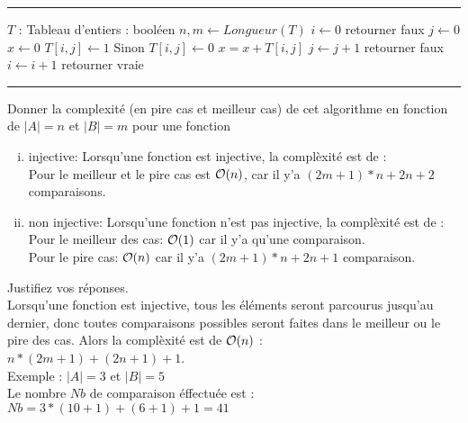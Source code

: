 \begin{enumerate}[1)]
\begin{framed}
\rule{0.8\textwidth}{0.4mm}
            \begin{algorithmic}[1]
                 {$T$ : Tableau d'entiers} : bool\'een
                    \State $n,m \gets Longueur(T)$
                    \State $i \gets 0 $
                     retourner faux
                    \EndIf
                       \State $j \gets 0$
                        \State $x \gets 0 $
                            $T[i,j] \gets 1$ 
                            \State Sinon $T[i,j] \gets 0$
                           \EndIf
                           \State $x = x + T[i,j]$
                           \State $j \gets j+1$
                        \EndWhile
                         retourner faux
                        \EndIf
                        \State $i \gets i+1$
                    \EndWhile
                    \State retourner vraie
                \EndFunction
            \end{algorithmic}
\rule{0.8\textwidth}{0.4mm}

\vspace{.5cm}
Donner la complexit\'e (en pire cas et meilleur cas) de cet algorithme en fonction de $|A|=n$ et $|B|=m$ pour une fonction
\begin{enumerate}[(i)]
\item injective:
Lorsqu'une fonction est injective, la complèxité est de :\\
Pour le meilleur et le pire cas est  ${\cal O}(n)$, car il y'a
$(2m+1)*n+2n+2$ comparaisons.\\
\item non injective: 
Lorsqu'une fonction n'est pas injective, la complèxité est de :\\
Pour le meilleur des cas:  ${\cal O}(1)$ car il y'a qu'une comparaison.\\
Pour le pire cas: ${\cal O}(n)$ car il y'a $(2m+1)*n+2n+1$ comparaison.\\

\end{enumerate}
Justifiez vos r\'eponses.\\
Lorsqu'une fonction est injective, tous les éléments seront parcourus jusqu'au dernier, donc toutes comparaisons possibles seront faites dans le meilleur ou le pire des cas. Alors la complèxité est de  ${\cal O}(n)$ :\\
$n*(2m+1)+(2n+1)+1$.\\
Exemple : $|A|=3$ et $|B|=5$ \\
Le nombre $Nb$ de comparaison éffectuée est : \\
$Nb = 3*(10+1)+(6+1)+1 = 41$


\end{framed}
\end{enumerate}
